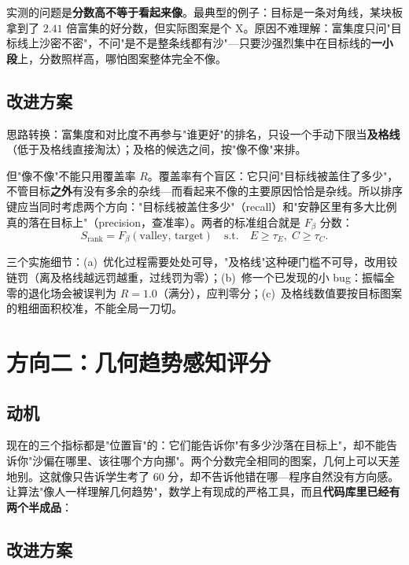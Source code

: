 \documentclass[11pt,a4paper]{article}
\begin{document}
实测的问题是\textbf{分数高不等于看起来像}。最典型的例子：目标是一条对角线，某块板拿到了 $2.41$ 倍富集的好分数，但实际图案是个 X。原因不难理解：富集度只问"目标线上沙密不密"，不问"是不是整条线都有沙"---只要沙强烈集中在目标线的\textbf{一小段}上，分数照样高，哪怕图案整体完全不像。

\subsection{改进方案}

思路转换：富集度和对比度不再参与"谁更好"的排名，只设一个手动下限当\textbf{及格线}（低于及格线直接淘汰）；及格的候选之间，按"像不像"来排。

但"像不像"不能只用覆盖率 $R$。覆盖率有个盲区：它只问"目标线被盖住了多少"，不管目标\textbf{之外}有没有多余的杂线---而看起来不像的主要原因恰恰是杂线。所以排序键应当同时考虑两个方向："目标线被盖住多少"（recall）和"安静区里有多大比例真的落在目标上"（precision，查准率）。两者的标准组合就是 $F_\beta$ 分数：
\begin{equation}
S_{\mathrm{rank}} = F_\beta(\mathrm{valley},\,\mathrm{target})
\quad\text{s.t.}\quad E \ge \tau_E,\; C \ge \tau_C .
\end{equation}

三个实施细节：(a)~优化过程需要处处可导，"及格线"这种硬门槛不可导，改用铰链罚（离及格线越远罚越重，过线罚为零）；(b)~修一个已发现的小 bug：振幅全零的退化场会被误判为 $R=1.0$（满分），应判零分；(c)~及格线数值要按目标图案的粗细面积校准，不能全局一刀切。

\section{方向二：几何趋势感知评分}

\subsection{动机}

现在的三个指标都是"位置盲"的：它们能告诉你"有多少沙落在目标上"，却不能告诉你"沙偏在哪里、该往哪个方向挪"。两个分数完全相同的图案，几何上可以天差地别。这就像只告诉学生考了 60 分，却不告诉他错在哪---程序自然没有方向感。让算法"像人一样理解几何趋势"，数学上有现成的严格工具，而且\textbf{代码库里已经有两个半成品}：

\subsection{改进方案}
\end{document}
